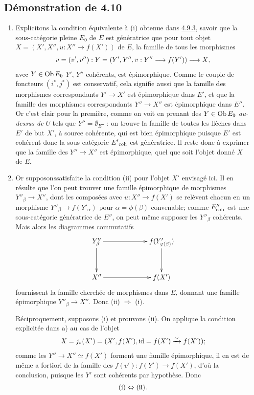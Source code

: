 \documentclass[10pt]{../fichiers-configuration-latex/smfart}
\begin{document}
\setcounter{subsection}{11}
\subsection{Démonstration de 4.10}

\begin{enumerate}
\renewcommand{\theenumi}{\alph{enumi}}
\renewcommand{\labelenumi}{\theenumi)}
\item Explicitons la condition équivalente à (i) obtenue dans \hyperref[VI.subsubsec4.9.3]{4.9.3},
  savoir que la sous-catégorie pleine $E_0$ de $E$ est génératrice \ie
  que pour tout objet $X = (X', X'', u : X''\to f(X'))$ de $E$, la
  famille de tous les morphismes
$$
v = (v', v'') : Y = (Y', Y'', v : Y''\to f(Y')) \to X {\quoi},
$$
avec $Y \in \operatorname{Ob} E_0$ \ie $Y'$, $Y''$ cohérents, est épimorphique. Comme
le couple de foncteurs $(i^{\ast}, j^{\ast})$ est conservatif, cela
signifie aussi que la famille des morphismes correspondants $Y' \to
X'$ est épimorphique dans $E'$, et que la famille des morphismes
correspondants $Y''\to X''$ est épimorphique dans $E''$. Or c'est
clair pour la première, comme on voit en prenant des $Y \in \operatorname{Ob} E_0$
\emph{au-dessus de} $U$ \ie tels que $Y'' = ∅_{E''}$ : on
trouve la famille de toutes les flèches dans $E'$ de but $X'$, à
source cohérente, qui est bien épimorphique puisque $E'$ est cohérent
donc la sous-catégorie ${E'}_{\mathrm{coh}}$ est génératrice. Il reste donc à
exprimer que la famille des $Y''\to X''$ est épimorphique, quel que
soit l'objet donné $X$ de $E$.

\item Or supposons\pageoriginale satisfaite la condition (ii) pour l'objet $X'$
  envisagé ici. Il en résulte que l'on peut trouver une famille
  épimorphique de morphismes $Y''_{\beta} \to X''$, dont les
  composées avec $u : X''\to f(X')$ se relèvent chacun en un morphisme
  $Y''_{\beta} \to f({Y'_{\alpha}})$ pour $\alpha = \phi(\beta)$
  convenable; comme $E''_{\mathrm{coh}}$ est une sous-catégorie génératrice
  de $E''$, on peut même supposer les $Y''_{\beta}$ cohérents. Mais
  alors les diagrammes commutatifs
\[
\xymatrix@C=2.25cm@R=1.25cm{
Y''_{\beta}  \ar[r] \ar[d]& f(Y'_{\varphi(\beta)}) \ar[d]\\
X'' \ar[r] & f(X')
}
\]
fournissent la famille cherchée de morphismes dans $E$, donnant une
famille épimorphique $Y''_{\beta} \to X''$. Donc (ii) $\Rightarrow$ (i).

Réciproquement, supposons (i) et prouvons (ii). On applique la
condition explicitée dans a) au cas de l'objet
$$
X = j_{\ast}(X') = (X', f(X'), \operatorname{id} = f(X') \xrightarrow{\sim} f(X')){};
$$
comme les $Y''\to X''\simeq f(X')$ forment une famille épimorphique,
il en est de même a fortiori de la famille des $f(v') : f(Y') \to
f(X')$, d'où la conclusion, puisque les $Y'$ sont cohérents par
hypothèse. Donc
$$
{\rm(i)} \Leftrightarrow {\rm(ii)}{}.
$$


\end{enumerate}
\end{document}
